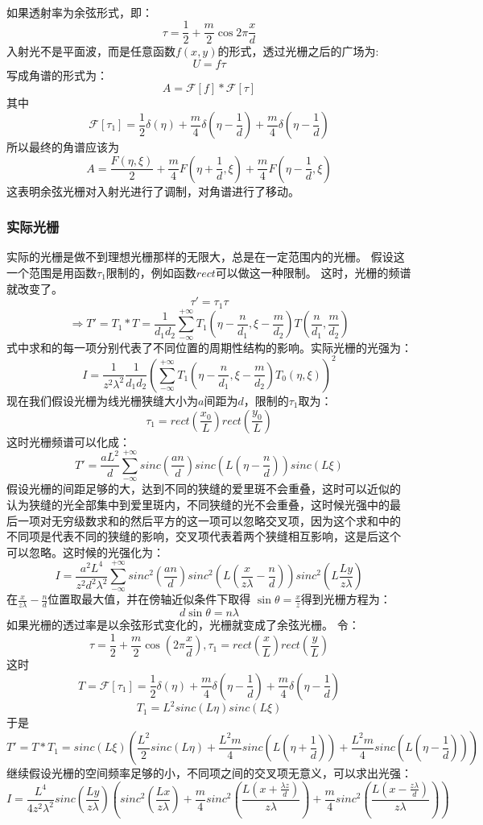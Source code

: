 \documentclass{article}
\begin{document}
\paragraph{}
如果透射率为余弦形式，即：
\[\tau=\frac{1}{2}+\frac{m}{2}\cos{2\pi \frac{x}{d}}\]
入射光不是平面波，而是任意函数$f(x,y)$的形式，透过光栅之后的广场为:
\[U=f\tau\]
写成角谱的形式为：
\[A=\mathscr{F}[f]*\mathscr{F}[\tau]\]
其中
\[\mathscr{F}[\tau_1]=\frac{1}{2}\delta(\eta)+\frac{m}{4}\delta(\eta-\frac{1}{d})+\frac{m}{4}\delta(\eta-\frac{1}{d})\]
所以最终的角谱应该为
\[A=\frac{F(\eta,\xi)}{2}+\frac{m}{4}F(\eta+\frac{1}{d},\xi)+\frac{m}{4}F(\eta-\frac{1}{d},\xi)\]
这表明余弦光栅对入射光进行了调制，对角谱进行了移动。
\subsubsection{实际光栅}
实际的光栅是做不到理想光栅那样的无限大，总是在一定范围内的光栅。
假设这一个范围是用函数$\tau_1$限制的，例如函数$rect$可以做这一种限制。
这时，光栅的频谱就改变了。
\[\tau'=\tau_1\tau\]
\[\Rightarrow
  T'=T_1*T=\frac{1}{d_1d_2}\sum_{-\infty}^{+\infty}T_1(\eta-\frac{n}{d_1},\xi-\frac{m}{d_2})T(\frac{n}{d_1},\frac{m}{d_2})\]
式中求和的每一项分别代表了不同位置的周期性结构的影响。实际光栅的光强为：
\[I=\frac{1}{z^2\lambda^2}\frac{1}{d_1d_2}(\sum_{-\infty}^{+\infty}T_1(\eta-\frac{n}{d_1},\xi-\frac{m}{d_2})T_0(\eta,\xi))^2\]
现在我们假设光栅为线光栅狭缝大小为$a$间距为$d$，限制的$\tau_1$取为：
\[\tau_1=rect(\frac{x_0}{L})rect(\frac{y_0}{L})\]
这时光栅频谱可以化成：
\[T'=\frac{aL^2}{d}\sum_{-\infty}^{+\infty}sinc(\frac{an}{d})sinc(L(\eta-\frac{n}{d}))sinc(L\xi)\]
假设光栅的间距足够的大，达到不同的狭缝的爱里斑不会重叠，这时可以近似的
认为狭缝的光全部集中到爱里斑内，不同狭缝的光不会重叠，这时候光强中的最
后一项对无穷级数求和的然后平方的这一项可以忽略交叉项，因为这个求和中的
不同项是代表不同的狭缝的影响，交叉项代表着两个狭缝相互影响，这是后这个
可以忽略。这时候的光强化为：
\[I=\frac{a^2L^4}{z^2d^2\lambda^2}\sum_{-\infty}^{+\infty}sinc^2(\frac{an}{d})sinc^2(L(\frac{x}{z\lambda}-\frac{n}{d}))sinc^2(L
  \frac{Ly}{z\lambda})\]
在$\frac{x}{z\lambda}-\frac{n}{d}$位置取最大值，并在傍轴近似条件下取得
$\sin{\theta}=\frac{x}{z}$得到光栅方程为：
\[d\sin{\theta}=n\lambda\]
如果光栅的透过率是以余弦形式变化的，光栅就变成了余弦光栅。
令：
\[\tau=\frac{1}{2}+\frac{m}{2}\cos(2\pi \frac{x}{d}),\tau_1=rect(\frac{x}{L})rect(\frac{y}{L})\]
这时
\[T=\mathscr{F}[\tau_1]=\frac{1}{2}\delta(\eta)+\frac{m}{4}\delta(\eta-\frac{1}{d})+\frac{m}{4}\delta(\eta-\frac{1}{d})\]
\[T_1=L^2sinc(L\eta)sinc(L\xi)\]
于是
\[T'=T*T_1=sinc(L\xi)(\frac{L^2}{2}sinc(L\eta)+\frac{L^2m}{4}sinc(L(\eta+\frac{1}{d}))+\frac{L^2m}{4}sinc(L(\eta-\frac{1}{d})))\]
继续假设光栅的空间频率足够的小，不同项之间的交叉项无意义，可以求出光强：
\[I=\frac{L^4}{4z^2\lambda^2}sinc(\frac{Ly}{z\lambda})(sinc^2(\frac{Lx}{z\lambda})+\frac{m}{4}sinc^2(\frac{L(x+\frac{\lambda
      z}{d})}{z\lambda})+\frac{m}{4}sinc^2(\frac{L(x-\frac{z\lambda}{d})}{z\lambda}))\]
\end{document}
